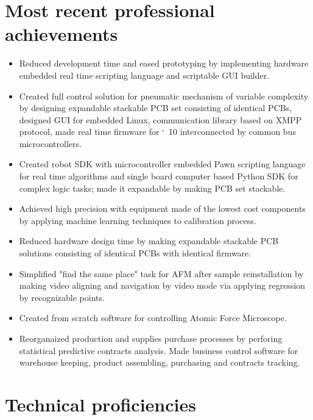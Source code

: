 \section{Most recent professional achievements}
\begin{itemize}

\item Reduced development time and eased prototyping by implementing hardware embedded real time scripting language and scriptable GUI builder.

\item Created full control solution for pneumatic mechanism of variable complexity by designing expandable stackable PCB set consisting of identical PCBs, designed GUI for embedded Linux, communication library based on XMPP protocol, made real time firmware for \char`~10 interconnected by common bus microcontrollers.

\item Created robot SDK with microcontroller embedded Pawn scripting language for real time algorithms and single board computer based Python SDK for complex logic tasks; made it expandable by making PCB set stackable.

\item Achieved high precision with equipment made of the lowest cost components by applying machine learning techniques to calibration process.

\item Reduced hardware design time by making expandable stackable PCB solutions consisting of identical PCBs with identical firmware.

\item Simplified "find the same place" task for AFM after sample reinstallation by making video aligning and navigation by video mode via applying regression by recognizable points.

\item Created from scratch software for controlling Atomic Force Microscope.

\item Reorganaized production and supplies purchase processes by perforing statistical predictive contracts analysis. Made business control software for warehouse keeping, product assembling, purchasing and contracts tracking.

\end{itemize}

\vspace*{-4mm}
\section{Technical proficiencies}

